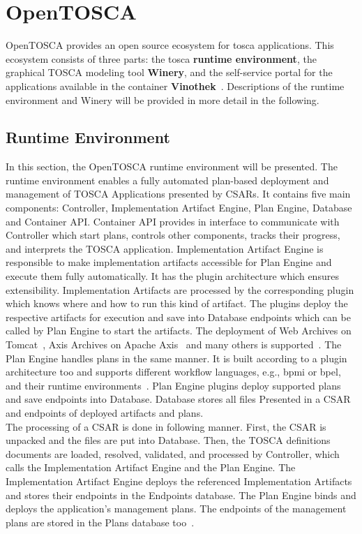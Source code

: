 \section{OpenTOSCA} \label{sec:opentosca}
OpenTOSCA provides an open source ecosystem for \gls{tosca} applications. 
This ecosystem consists of three parts: the \gls{tosca} \textbf{runtime environment}, the graphical TOSCA modeling tool \textbf{Winery}, and the self-service portal for the applications available in the container \textbf{Vinothek}~\cite*{OpenTOSCA}.
Descriptions of the runtime environment and Winery will be provided in more detail in the following. 
\subsection*{Runtime Environment}
In this section, the OpenTOSCA runtime environment will be presented.
The runtime environment enables a fully automated plan-based deployment and management of TOSCA Applications presented by CSARs. 
It contains five main components: Controller, Implementation Artifact Engine, Plan Engine, Database and Container API.
Container API provides in interface to communicate with Controller which  start plans, controls other components, tracks their progress, and interprets the TOSCA application.
Implementation Artifact Engine is responsible to make implementation artifacts accessible for Plan Engine and execute them fully automatically.
It has the plugin architecture which ensures extensibility.
Implementation Artifacts are processed by the corresponding plugin which knows where and how to run this kind of artifact. 
The plugins deploy the respective artifacts for execution and save into Database endpoints which can be called by Plan Engine to start the artifacts.
The deployment of Web Archives on Tomcat~\cite*{tomcat}, Axis Archives on Apache Axis~\cite*{axis} and many others is supported~\cite*{macharb}.
The Plan Engine handles plans in the same manner.
It is built according to a plugin architecture too and supports different workflow languages, e.g., \gls{bpmi} or \gls{bpel}, and their runtime environments~\cite{INPROC-2013-45}.
Plan Engine plugins deploy supported plans and save endpoints into Database.
Database stores all files Presented in a CSAR and endpoints of deployed artifacts and plans.
\\
The processing of a CSAR is done in following manner.  
First, the CSAR is unpacked and the files are put into Database.
Then, the TOSCA definitions documents are loaded, resolved, validated, and processed by Controller, which calls the Implementation Artifact Engine and the Plan Engine.
The Implementation Artifact Engine deploys the referenced Implementation Artifacts and stores their endpoints in the Endpoints database. 
The Plan Engine binds and deploys the application’s management plans.
The endpoints of the management plans are stored in the Plans database too~\cite{INPROC-2013-45}.
%
%
